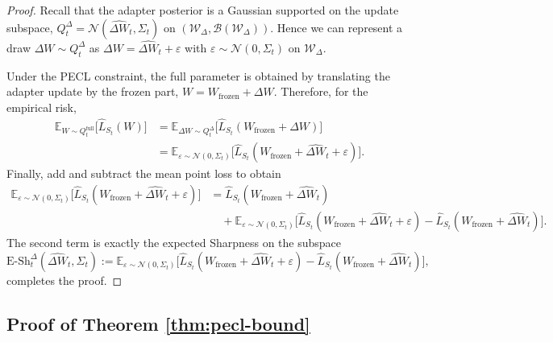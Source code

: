 \documentclass{article}
\theoremstyle{plain}
\theoremstyle{definition}
\theoremstyle{remark}
\begin{document}
\begin{proof}
Recall that the adapter posterior is a Gaussian supported on the update subspace,
$
Q_t^\Delta = \mathcal N(\hat{\Delta W}_t,\Sigma_t)
$
on $(\mathcal W_\Delta,\mathcal B(\mathcal W_\Delta))$.
Hence we can represent a draw $\Delta W \sim Q_t^\Delta$ as
$
\Delta W = \hat{\Delta W}_t + \varepsilon
$
with $\varepsilon \sim \mathcal N(0,\Sigma_t)$ on $\mathcal W_\Delta$.

Under the PECL constraint, the full parameter is obtained by translating the adapter update by the frozen part,
$
W = W_{\mathrm{frozen}} + \Delta W.
$
Therefore, for the empirical risk,
\begin{align*}
\mathbb E_{W \sim Q_t^{\mathrm{full}}}\big[\hat L_{S_t}(W)\big]
&= \mathbb E_{\Delta W \sim Q_t^\Delta}\big[\hat L_{S_t}(W_{\mathrm{frozen}}+\Delta W)\big] \\
&= \mathbb E_{\varepsilon \sim \mathcal N(0,\Sigma_t)}
\big[\hat L_{S_t}(W_{\mathrm{frozen}}+\hat{\Delta W}_t+\varepsilon)\big].
\end{align*}
Finally, add and subtract the mean point loss to obtain
\begin{align*}
\mathbb E_{\varepsilon \sim \mathcal N(0,\Sigma_t)}
\big[\hat L_{S_t}(W_{\mathrm{frozen}}+\hat{\Delta W}_t+\varepsilon)\big]
&=
\hat L_{S_t}(W_{\mathrm{frozen}}+\hat{\Delta W}_t) \\
&\quad +
\mathbb E_{\varepsilon \sim \mathcal N(0,\Sigma_t)}
\Big[
\hat L_{S_t}(W_{\mathrm{frozen}}+\hat{\Delta W}_t+\varepsilon)
-
\hat L_{S_t}(W_{\mathrm{frozen}}+\hat{\Delta W}_t)
\Big].
\end{align*}
The second term is exactly the expected Sharpness on the subspace
\[
\mathrm{E\text{-}Sh}_t^\Delta(\hat{\Delta W}_t,\Sigma_t)
:=
\mathbb E_{\varepsilon \sim \mathcal N(0,\Sigma_t)}
\Big[
\hat L_{S_t}(W_{\mathrm{frozen}}+\hat{\Delta W}_t+\varepsilon)
-
\hat L_{S_t}(W_{\mathrm{frozen}}+\hat{\Delta W}_t)
\Big],
\]
completes the proof.
\end{proof}



\subsection{Proof of Theorem \ref{thm:pecl-bound}}
\label{proof:theorem}

\end{document}
